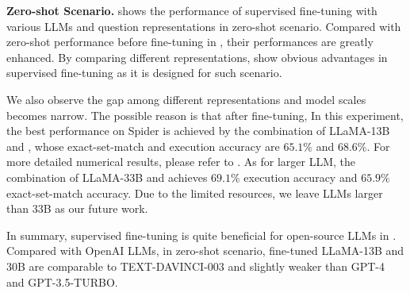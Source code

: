 \textbf{Zero-shot Scenario.}
 shows the performance of supervised fine-tuning with various LLMs and question representations in zero-shot scenario. 
Compared with zero-shot performance before fine-tuning in 
, their performances are greatly enhanced. 
By comparing different representations, \alpacaprompt show obvious advantages in supervised fine-tuning as it is designed for such scenario.

We also observe the gap among different representations and model scales becomes narrow. 
The possible reason is that after fine-tuning,  
In this experiment, the best performance on Spider is achieved by the combination of LLaMA-13B and \alpacaprompt, whose exact-set-match and execution accuracy are $65.1\%$ and $68.6\%$. 
For more detailed numerical results, please refer to . 
As for larger LLM, the combination of LLaMA-33B and \sqlprompt achieves $69.1\%$ execution accuracy and $65.9\%$ exact-set-match accuracy. 
Due to the limited resources, we leave LLMs larger than 33B as our future work. 

In summary, supervised fine-tuning is quite beneficial for open-source LLMs in \nlsql. 
Compared with OpenAI LLMs, in zero-shot scenario, fine-tuned LLaMA-13B and 30B are comparable to TEXT-DAVINCI-003 and slightly weaker than GPT-4 and GPT-3.5-TURBO. 

